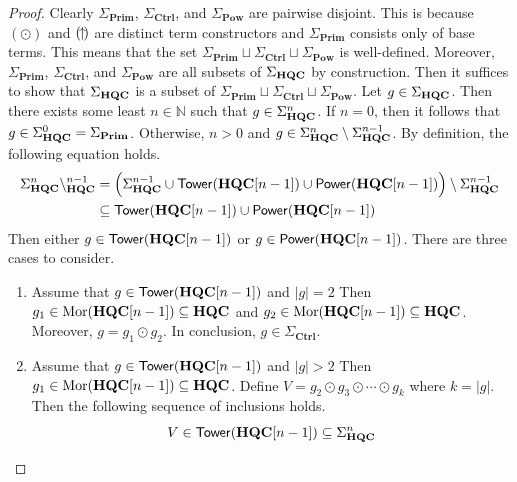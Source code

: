 \begin{proof}
    Clearly $\Sigma_{\textbf{Prim}}$, $\Sigma_{\textbf{Ctrl}}$, and $\Sigma_{\textbf{Pow}}$ are pairwise disjoint.
    This is because $( \odot )$ and $( \!\uparrow\! )$ are distinct term constructors and $\Sigma_{\textbf{Prim}}$ consists only of base terms.
    This means that the set $\Sigma_{\textbf{Prim}} \sqcup \Sigma_{\textbf{Ctrl}} \sqcup \Sigma_{\textbf{Pow}}$ is well-defined.
    Moreover, $\Sigma_{\textbf{Prim}}$, $\Sigma_{\textbf{Ctrl}}$, and $\Sigma_{\textbf{Pow}}$ are all subsets of $\Sigma_{\mathbf{HQC}}$ by construction.
    Then it suffices to show that $\Sigma_{\mathbf{HQC}}$ is a subset of $\Sigma_{\textbf{Prim}} \sqcup \Sigma_{\textbf{Ctrl}} \sqcup \Sigma_{\textbf{Pow}}$.
    Let $g \in \Sigma_{\mathbf{HQC}}$.
    Then there exists some least $n \in \mathbb{N}$ such that $g \in \Sigma_{\mathbf{HQC}}^n$.
    If $n = 0$, then it follows that $g \in \Sigma_{\mathbf{HQC}}^0 = \Sigma_{\textbf{Prim}}$.
    Otherwise, $n > 0$ and $g \in \Sigma_{\mathbf{HQC}}^n \setminus \Sigma_{\mathbf{HQC}}^{n-1}$.
    By definition, the following equation holds.
    \begin{align*}
        \Sigma_{\mathbf{HQC}}^n \setminus_{\mathbf{HQC}}^{n-1}
        &=
        \left(
            \Sigma_{\mathbf{HQC}}^{n-1}
            \cup
            \mathsf{Tower}( \mathbf{HQC}[n-1] )
            \cup
            \mathsf{Power}( \mathbf{HQC}[n-1] )
        \right)
        \setminus
        \Sigma_{\mathbf{HQC}}^{n-1}
        \\
        &\subseteq
        \mathsf{Tower}( \mathbf{HQC}[n-1] )
        \cup
        \mathsf{Power}( \mathbf{HQC}[n-1] )
    \end{align*}
    Then either $g \in \mathsf{Tower}( \mathbf{HQC}[n-1] )$ or $g \in \mathsf{Power}( \mathbf{HQC}[n-1] )$.
    There are three cases to consider.
    \begin{enumerate}
    \item Assume that $g \in \mathsf{Tower}( \mathbf{HQC}[n-1] )$ and $|g| = 2$
          Then $g_1 \in \operatorname{Mor}( \mathbf{HQC}[n-1] ) \subseteq \mathbf{HQC}$ and $g_2 \in \operatorname{Mor}( \mathbf{HQC}[n-1] ) \subseteq \mathbf{HQC}$.
          Moreover, $g = g_1 \odot g_2$.
          In conclusion, $g \in \Sigma_{\mathbf{Ctrl}}$.
    \item Assume that $g \in \mathsf{Tower}( \mathbf{HQC}[n-1] )$ and $|g| > 2$
          Then $g_1 \in \operatorname{Mor}( \mathbf{HQC}[n-1] ) \subseteq \mathbf{HQC}$.
          Define $V = g_2 \odot g_3 \odot \cdots \odot g_k$ where $k = |g|$.
          Then the following sequence of inclusions holds.
          \begin{equation*}
              V \in \Tower( \CatHQC[n-1] )
              \subseteq
              \Sigma_{\CatHQC}^n

\end{equation*}
\end{enumerate}
\end{proof}
